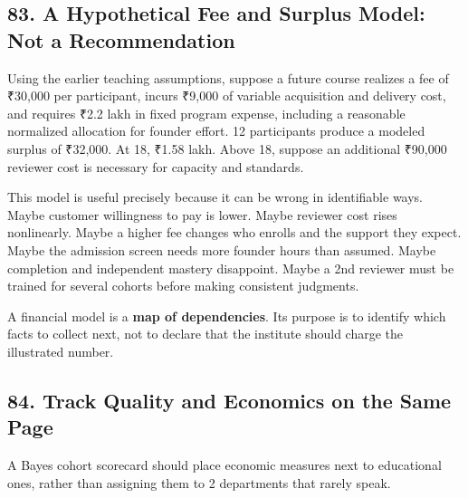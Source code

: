 \subsection*{83. A Hypothetical Fee and Surplus Model: Not a Recommendation}

Using the earlier teaching assumptions, suppose a future course realizes a fee of ₹30,000 per participant, incurs ₹9,000 of variable acquisition and delivery cost, and requires ₹2.2 lakh in fixed program expense, including a reasonable normalized allocation for founder effort. 12 participants produce a modeled surplus of ₹32,000. At 18, ₹1.58 lakh. Above 18, suppose an additional ₹90,000 reviewer cost is necessary for capacity and standards.

This model is useful precisely because it can be wrong in identifiable ways. Maybe customer willingness to pay is lower. Maybe reviewer cost rises nonlinearly. Maybe a higher fee changes who enrolls and the support they expect. Maybe the admission screen needs more founder hours than assumed. Maybe completion and independent mastery disappoint. Maybe a 2nd reviewer must be trained for several cohorts before making consistent judgments.

A financial model is a \textbf{map of dependencies}. Its purpose is to identify which facts to collect next, not to declare that the institute should charge the illustrated number.

\subsection*{84. Track Quality and Economics on the Same Page}

A Bayes cohort scorecard should place economic measures next to educational ones, rather than assigning them to 2 departments that rarely speak.

